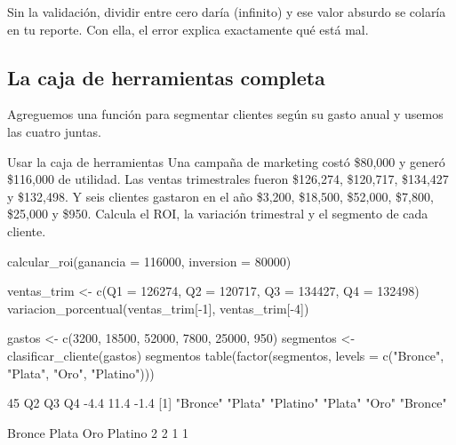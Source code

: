 Sin la validación, dividir entre cero daría  (infinito) y ese
valor absurdo se colaría en tu reporte. Con ella, el error explica
exactamente qué está mal.

\subsection{La caja de herramientas completa}

Agreguemos una función para segmentar clientes según su gasto anual y
usemos las cuatro juntas.


\begin{ejemplo}{Usar la caja de herramientas}
Una campaña de marketing costó \$80,000 y generó \$116,000 de utilidad.
Las ventas trimestrales fueron \$126,274, \$120,717, \$134,427 y \$132,498.
Y seis clientes gastaron en el año \$3,200, \$18,500, \$52,000, \$7,800,
\$25,000 y \$950. Calcula el ROI, la variación trimestral y el segmento de
cada cliente.
\end{ejemplo}

\begin{rcode}
calcular_roi(ganancia = 116000, inversion = 80000)

ventas_trim <- c(Q1 = 126274, Q2 = 120717, Q3 = 134427, Q4 = 132498)
variacion_porcentual(ventas_trim[-1], ventas_trim[-4])

gastos <- c(3200, 18500, 52000, 7800, 25000, 950)
segmentos <- clasificar_cliente(gastos)
segmentos
table(factor(segmentos, levels = c("Bronce", "Plata", "Oro",
                                    "Platino")))
\end{rcode}
\begin{rsalida}
[1] 45
  Q2   Q3   Q4 
-4.4 11.4 -1.4 
[1] "Bronce"  "Plata"   "Platino" "Plata"   "Oro"     "Bronce" 

 Bronce   Plata     Oro Platino 
      2       2       1       1 
\end{rsalida}

